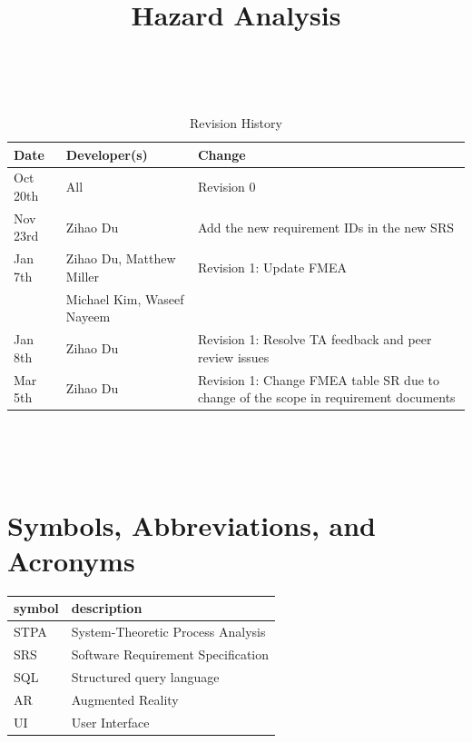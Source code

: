 \documentclass{article}
\title{Hazard Analysis\\\progname}
\author{\authname}
\date{}
\begin{document}
\maketitle
\thispagestyle{empty}

~\newpage


\begin{table}[hp]
\caption{Revision History} \label{TblRevisionHistory}
\begin{tabularx}{\textwidth}{llX}
\toprule
\textbf{Date} & \textbf{Developer(s)} & \textbf{Change}\\
\midrule
Oct 20th & All & Revision 0\\
Nov 23rd & Zihao Du & Add the new requirement IDs in the new SRS\\
Jan 7th & Zihao Du, Matthew Miller & Revision 1: Update FMEA\\
& Michael Kim, Waseef Nayeem & \\
Jan 8th & Zihao Du & Revision 1: Resolve TA feedback and peer review issues\\
Mar 5th & Zihao Du & Revision 1: Change FMEA table SR due to change of the scope in requirement documents\\
\bottomrule
\end{tabularx}
\end{table}

~\newpage

\tableofcontents

~\newpage


\section{Symbols, Abbreviations, and Acronyms}

\renewcommand{\arraystretch}{1.2}
\begin{tabular}{l l} 
  \toprule		
  \textbf{symbol} & \textbf{description}\\
  \midrule 
  STPA & System-Theoretic Process Analysis\\
  \midrule
  SRS & Software Requirement Specification\\
  \midrule
  SQL & Structured query language\\
  \midrule
  AR & Augmented Reality\\
  \midrule
  UI & User Interface\\
  \bottomrule
\end{tabular}\\
\end{document}
